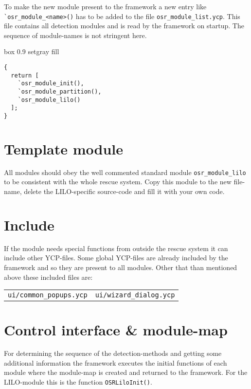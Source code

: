 To make the new module present to the framework a new
entry like \verb+`osr_module_<name>()+ has to be added to the file
\verb+osr_module_list.ycp+. This file contains all detection modules
and is read by the framework on startup. The sequence of module-names
is not stringent here.

\begin{program}[h!]
\begin{boxitpara}{box 0.9 setgray fill}
{\footnotesize \begin{verbatim}
{
  return [
    `osr_module_init(),
    `osr_module_partition(),
    `osr_module_lilo()
  ];
}
\end{verbatim}}
\end{boxitpara}
\caption{Contents of the file {\tt osr\_module\_list.ycp} so far}
\end{program}

\section{Template module}
All modules should obey the well commented standard module
\verb+osr_module_lilo+ to be consistent with the whole rescue system.
Copy this module to the new file-name, delete the LILO-specific
source-code and fill it with your own code.

\section{Include}
If the module needs special functions from outside the rescue system it
can include other YCP-files. Some global YCP-files are already included
by the framework and so they are present to all modules. Other that than
mentioned above these included files are:\\

\begin{tabular}{p{5cm}p{5cm}}
\verb+ui/common_popups.ycp+ & \verb+ui/wizard_dialog.ycp+\\
\end{tabular}

\section{Control interface \& module-map}
For determining the sequence of the detection-methods and getting some
additional information the framework executes the initial functions of
each module where the module-map is created and returned to the framework.
For the LILO-module this is the function \verb+OSRLiloInit()+.\\

